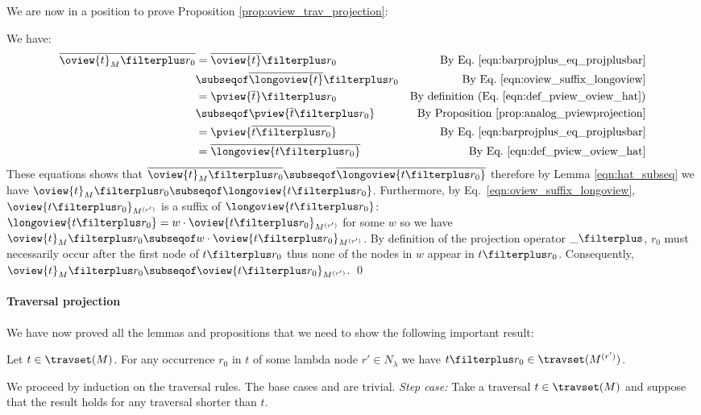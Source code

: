 We are now in a position to prove Proposition
\ref{prop:oview_trav_projection}:


We have:
\begin{align*}
  \overline{\oview{t}_M\filterplus r_0}
        &= \overline{\oview{t}} \filterplus r_0 & \mbox{By Eq.\ \ref{eqn:barprojplus_eq_projplusbar}} \\
        &\subseqof \overline{\longoview{t}} \filterplus r_0 & \mbox{By Eq.\ \ref{eqn:oview_suffix_longoview}} \\
        &= \pview{\overline{t}} \filterplus r_0 & \mbox{By definition (Eq.\ \ref{eqn:def_pview_oview_hat})} \\
        &\subseqof \pview{\overline{t} \filterplus r_0}  & \mbox{By Proposition \ref{prop:analog_pviewprojection}} \\
        &= \pview{\overline{t \filterplus r_0}}  & \mbox{By Eq.\ \ref{eqn:barprojplus_eq_projplusbar}} \\
        &= \overline{\longoview{t \filterplus r_0}}  & \mbox{By Eq.\ \ref{eqn:def_pview_oview_hat}}
\end{align*}
These equations shows that $\overline{\oview{t}_M\filterplus r_0}
\subseqof \overline{\longoview{t \filterplus r_0}}$ therefore by
Lemma \ref{eqn:hat_subseq} we have $\oview{t}_M\filterplus r_0
\subseqof \longoview{t \filterplus r_0}$. Furthermore, by Eq.\
\ref{eqn:oview_suffix_longoview}, $\oview{t \filterplus
r_0}_{M^{(r')}}$ is a suffix of $\longoview{t \filterplus r_0}$:
$\longoview{t \filterplus r_0} = w \cdot \oview{t \filterplus
r_0}_{M^{(r')}}$ for some $w$ so we have $\oview{t}_M\filterplus r_0
\subseqof w \cdot \oview{t \filterplus r_0}_{M^{(r')}}$. By
definition of the projection operator $\_ \filterplus$, $r_0$ must
necessarily occur after the first node of $t \filterplus r_0$ thus
none of the nodes in $w$ appear in $t\filterplus r_0$. Consequently,
$\oview{t}_M\filterplus r_0 \subseqof \oview{t \filterplus
r_0}_{M^{(r')}}$. \qed


\begin{example}

\end{example}

\paragraph{Traversal projection}
We have now proved all the lemmas and propositions that we need to
show the following important result:
\begin{proposition}
    \label{prop:trav_projection}
    Let $t \in \travset(M)$. For any occurrence $r_0$ in $t$ of some lambda node
    $r'\in N_\lambda$ we have $t\filterplus r_0 \in \travset(M^{(r')})$.
\end{proposition}
\proof
    We proceed by induction on the traversal rules. The base cases  and
    \rulenamet{Root} are trivial. \emph{Step case:} Take a traversal $t \in \travset(M)$ and suppose that the result holds for any traversal shorter than $t$.

